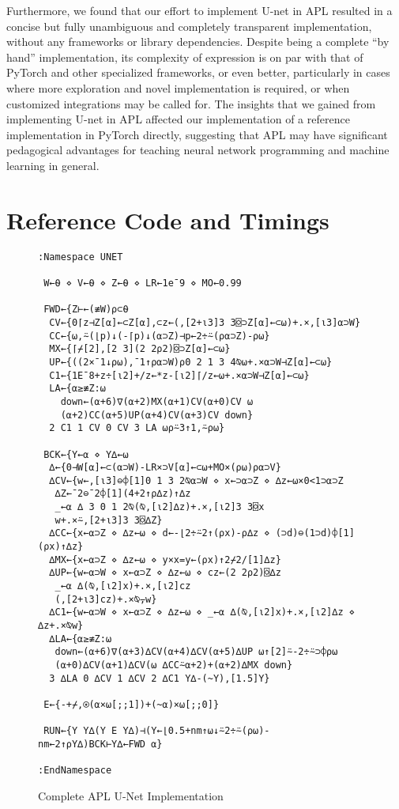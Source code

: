 \documentclass[10pt,twocolumn,english,format=sigplan,screen,balance]{acmart}
\begin{document}
Furthermore, we found that our effort to implement U-net in APL resulted
in a concise but fully unambiguous and completely transparent implementation,
without any frameworks or library dependencies. Despite being a complete
“by hand” implementation, its complexity of expression is on
par with that of PyTorch and other specialized frameworks, or even
better, particularly in cases where more exploration and novel implementation
is required, or when customized integrations may be called for. The
insights that we gained from implementing U-net in APL affected our
implementation of a reference implementation in PyTorch directly,
suggesting that APL may have significant pedagogical advantages for
teaching neural network programming and machine learning in general.

\appendix

\section{Reference Code and Timings}

\begin{figure*}
\begin{verbatim}
:Namespace UNET

 W←⍬ ⋄ V←⍬ ⋄ Z←⍬ ⋄ LR←1e¯9 ⋄ MO←0.99

 FWD←{Z⊢←(≢W)⍴⊂⍬
  CV←{0⌈z⊣Z[⍺]←⊂Z[⍺],⊂z←(,[2+⍳3]3 3⌺⊃Z[⍺]←⊂⍵)+.×,[⍳3]⍺⊃W}
  CC←{⍵,⍨(⌊p)↓(-⌈p)↓(⍺⊃Z)⊣p←2÷⍨(⍴⍺⊃Z)-⍴⍵}
  MX←{⌈⌿[2],[2 3](2 2⍴2)⌺⊃Z[⍺]←⊂⍵}
  UP←{((2×¯1↓⍴⍵),¯1↑⍴⍺⊃W)⍴0 2 1 3 4⍉⍵+.×⍺⊃W⊣Z[⍺]←⊂⍵}
  C1←{1E¯8+z÷[⍳2]+/z←*z-[⍳2]⌈/z←⍵+.×⍺⊃W⊣Z[⍺]←⊂⍵}
  LA←{⍺≥≢Z:⍵
    down←(⍺+6)∇(⍺+2)MX(⍺+1)CV(⍺+0)CV ⍵
    (⍺+2)CC(⍺+5)UP(⍺+4)CV(⍺+3)CV down}
  2 C1 1 CV 0 CV 3 LA ⍵⍴⍨3↑1,⍨⍴⍵}

 BCK←{Y←⍺ ⋄ Y∆←⍵
  ∆←{0⊣W[⍺]←⊂(⍺⊃W)-LR×⊃V[⍺]←⊂⍵+MO×(⍴⍵)⍴⍺⊃V}
  ∆CV←{w←,[⍳3]⊖⌽[1]0 1 3 2⍉⍺⊃W ⋄ x←⊃⍺⊃Z ⋄ ∆z←⍵×0<1⊃⍺⊃Z
   ∆Z←¯2⊖¯2⌽[1](4+2↑⍴∆z)↑∆z
   _←⍺ ∆ 3 0 1 2⍉(⍉,[⍳2]∆z)+.×,[⍳2]3 3⌺x
   w+.×⍨,[2+⍳3]3 3⌺∆Z}
  ∆CC←{x←⍺⊃Z ⋄ ∆z←⍵ ⋄ d←-⌊2÷⍨2↑(⍴x)-⍴∆z ⋄ (⊃d)⊖(1⊃d)⌽[1](⍴x)↑∆z}
  ∆MX←{x←⍺⊃Z ⋄ ∆z←⍵ ⋄ y×x=y←(⍴x)↑2⌿2/[1]∆z}
  ∆UP←{w←⍺⊃W ⋄ x←⍺⊃Z ⋄ ∆z←⍵ ⋄ cz←(2 2⍴2)⌺∆z
   _←⍺ ∆(⍉,[⍳2]x)+.×,[⍳2]cz
   (,[2+⍳3]cz)+.×⍉⍪w}
  ∆C1←{w←⍺⊃W ⋄ x←⍺⊃Z ⋄ ∆z←⍵ ⋄ _←⍺ ∆(⍉,[⍳2]x)+.×,[⍳2]∆z ⋄ ∆z+.×⍉w}
  ∆LA←{⍺≥≢Z:⍵
   down←(⍺+6)∇(⍺+3)∆CV(⍺+4)∆CV(⍺+5)∆UP ⍵↑[2]⍨-2÷⍨⊃⌽⍴⍵
   (⍺+0)∆CV(⍺+1)∆CV(⍵ ∆CC⍨⍺+2)+(⍺+2)∆MX down}
  3 ∆LA 0 ∆CV 1 ∆CV 2 ∆C1 Y∆-(~Y),[1.5]Y}

 E←{-+⌿,⍟(⍺×⍵[;;1])+(~⍺)×⍵[;;0]}

 RUN←{Y Y∆(Y E Y∆)⊣(Y←⌊0.5+nm↑⍵↓⍨2÷⍨(⍴⍵)-nm←2↑⍴Y∆)BCK⊢Y∆←FWD ⍺}

:EndNamespace
\end{verbatim}
\caption{Complete APL U-Net Implementation}

\end{figure*}
\end{document}
